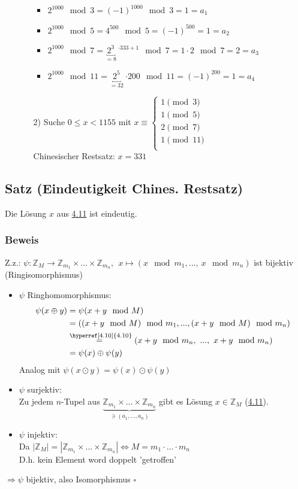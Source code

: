 \documentclass[12pt,titlepage, pdf]{article}
\newcommand{\qed}{\hfill$\square$}
\renewcommand{\>}{\rightarrow}
\renewcommand{\*}{\cdot}
\begin{document}
\begin{itemize}
\begin{itemize}
			\begin{itemize}
				\item $2^{1000} \mod 3 = (-1)^{1000} \mod 3 = 1=a_1$
				\item $2^{1000} \mod 5 = 4^{500} \mod 5 = (-1)^{500} = 1=a_2$
				\item $2^{1000} \mod 7 = \underbracket{2^3}_{=8}~^{\*333+1} \mod 7 = 1 \cdot 2\mod 7 = 2=a_3$
				\item $2^{1000} \mod 11 = \underbracket{2^5}_{=32}~{\*200} \mod 11 = (-1)^{200} = 1=a_4$
			\end{itemize}
			\item[2)] Suche $0 \leq x < 1155$ mit $x \equiv \begin{cases*}
			1 \pmod{3}\\
			1 \pmod {5}\\
			2 \pmod {7}\\
			1 \pmod{ 11}\\
			\end{cases*}$\\
			Chinesischer Restsatz: $x = 331$
		\end{itemize}
	\end{itemize}
	\subsection{Satz (Eindeutigkeit Chines. Restsatz)}
	\label{4.13}
	Die Lösung $x$ aus \hyperref[4.11]{4.11} ist eindeutig.
	\subsubsection*{Beweis}
	Z.z.: $\psi : \mathds{Z}_M \rightarrow \mathds{Z}_{m_1} \times ... \times \mathds{Z}_{m_n},~~ x \mapsto (x \mod m_1,...,~x \mod m_n)$ ist bijektiv (Ringisomorphismus)
	\begin{itemize}
		\item $\psi$ Ringhomomorphismus:
		\begin{align*}
		\psi (x \oplus y) &= \psi(x+y \mod M)\\
		&= ((x+y \mod M) \mod m_1,..., (x+y \mod M) \mod m_n)\\
		&\overset{\textrm{\hyperref[4.10]{4.10}}}{=~} (x+y \mod m_n,~..., ~x+y \mod m_n) \\
		&= \psi(x) \oplus \psi(y)
		\end{align*}
		Analog mit $\psi(x \odot y) = \psi(x) \odot \psi(y)$
		\item $\psi$ surjektiv:\\
		Zu jedem $n$-Tupel aus $\underbrace{\mathds{Z}_{m_1} \times ... \times \mathds{Z}_{m_n}}_{\ni(a_1,...,a_n)}$ gibt es Lösung $x \in \mathds{Z}_M$ (\hyperref[4.11]{4.11}).
		\item $\psi$ injektiv: \\
		Da $| \mathds{Z}_M| = | \mathds{Z}_{m_1} \times ... \times \mathds{Z}_{m_n}| \Leftrightarrow M = m_1 \cdot ... \cdot m_n$ \\
		D.h. kein Element word doppelt 'getroffen' \\
	\end{itemize}
	$\Rightarrow \psi$ bijektiv, also Isomorphismus 
	\qed
\end{document}
